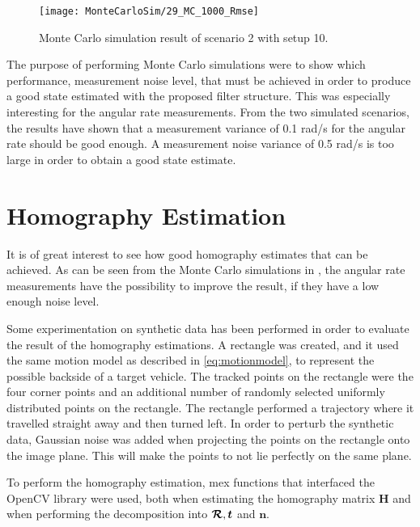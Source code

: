 \begin{figure}[!ht]
	\centering
	\texttt{[image: MonteCarloSim/29\_MC\_1000\_Rmse]}
	\caption{\label{fig:29montesimcrossingroiangvelcornerrmse} Monte Carlo simulation result of scenario 2 with setup 10.}
\end{figure}

\newpage

The purpose of performing Monte Carlo simulations were to show which performance, \ie measurement noise level, that must be achieved in order to produce a good state estimated with the proposed filter structure.
This was especially interesting for the angular rate measurements.
From the two simulated scenarios, the results have shown that a measurement variance of 0.1 rad/s for the angular rate should be good enough.
A measurement noise variance of 0.5 rad/s is too large in order to obtain a good state estimate.

\newpage

\section{Homography Estimation}
\label{sec:homographyestimationresults}
It is of great interest to see how good homography estimates that can be achieved.
As can be seen from the Monte Carlo simulations in , the angular rate measurements have the possibility to improve the result, if they have a low enough noise level.

Some experimentation on synthetic data has been performed in order to evaluate the result of the homography estimations.
A rectangle was created, and it used the same motion model as described in \eqref{eq:motionmodel}, to represent the possible backside of a target vehicle.
The tracked points on the rectangle were the four corner points and an additional number of randomly selected uniformly distributed points on the rectangle.
The rectangle performed a trajectory where it travelled straight away and then turned left.
In order to perturb the synthetic data, Gaussian noise was added when projecting the points on the rectangle onto the image plane.
This will make the points to not lie perfectly on the same plane.

To perform the homography estimation, \matlab mex functions that interfaced the OpenCV library \cite{mexopencv} were used, both when estimating the homography matrix $\bm{H}$ and when performing the decomposition into $\bm{\mathcal{R}}, \bm{t}$ and $\bm{n}$.

